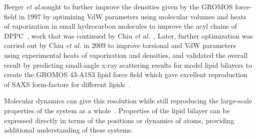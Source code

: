 \documentclass[12pt,openany,final]{book}
\newcommand{\etal}{\textit{et al.}}
\begin{document}
Berger \etal sought to further improve the densities given by the GROMOS force-field in 1997 
by optimizing VdW parameters using molecular volumes and
heats of vaporization in small hydrocarbon molecules to improve the acyl chains of DPPC~\cite{berger:1997},
work that was continued by Chiu \etal~\cite{chiu:1999:optimization,chiu:2003:structure}, 
Later, further optimization was carried out by Chiu \etal 
in 2009 to improve torsional and VdW parameters using experimental 
heats of vaporization and densities, and validated
the overall result by predicting small-angle x-ray scattering 
results for model lipid bilayers to create the GROMOS 43-A1S3 lipid force field which gave excellent reproduction of SAXS form-factors for
different lipids~\cite{chiu:2009}.

Molecular dynamics can give this resolution while still reproducing the large-scale properties of the system as a whole~\cite{pandit:2008:simulationtextbook,dror:2012:biomicroscope}. 
Properties of the lipid bilayer can be expressed directly in terms of the positions or dynamics of atoms, 
providing additional understanding of these systems.
\end{document}
